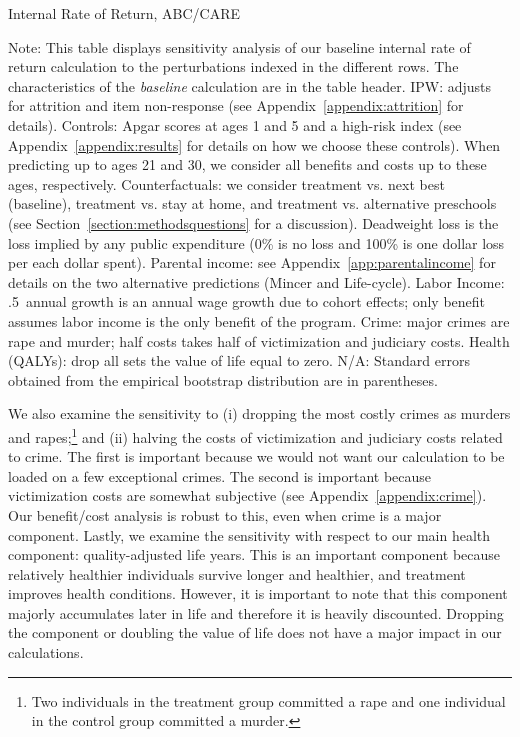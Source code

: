 \begin{table} 
\begin{threeparttable}
\caption{Internal Rate of Return, ABC/CARE}
\label{table:irrsens}
\centering 
\footnotesize

\begin{tablenotes}
\footnotesize
\item Note: This table displays sensitivity analysis of our baseline internal rate of return calculation to the perturbations indexed in the different rows. The characteristics of the \textit{baseline} calculation are in the table header. IPW: adjusts for attrition and item non-response (see Appendix~\ref{appendix:attrition} for details). Controls: Apgar scores at ages 1 and 5 and a high-risk index (see Appendix~\ref{appendix:results} for details on how we choose these controls). When predicting up to ages 21 and 30, we consider all benefits and costs up to these ages, respectively. Counterfactuals: we consider treatment vs. next best (baseline), treatment vs. stay at home, and treatment vs. alternative preschools (see Section~\ref{section:methodsquestions} for a discussion). Deadweight loss is the loss implied by any public expenditure (0\% is no loss and 100\% is one dollar loss per each dollar spent). Parental income: see Appendix~\ref{app:parentalincome} for details on the two alternative predictions (Mincer and Life-cycle). Labor Income: .5\ annual growth is an annual wage growth due to cohort effects; only benefit assumes labor income is the only benefit of the program. Crime: major crimes are rape and murder; half costs takes half of victimization and judiciary costs. Health (QALYs): drop all sets the value of life equal to zero. N/A: Standard errors obtained from the empirical bootstrap distribution are in parentheses.
\end{tablenotes}
\end{threeparttable}
\end{table}
\restoregeometry
\doublespacing

We also examine the sensitivity to (i) dropping the most costly crimes as murders and rapes;\footnote{Two individuals in the treatment group committed a rape and one individual in the control group committed a murder.} and (ii) halving the costs of victimization and judiciary costs related to crime.  The first is important because we would not want our calculation to be loaded on a few exceptional crimes. The second is important because victimization costs are somewhat subjective (see Appendix~\ref{appendix:crime}). Our benefit/cost analysis is robust to this, even when crime is a major component. Lastly, we examine the sensitivity with respect to our main health component: quality-adjusted life years. This is an important component because relatively healthier individuals survive longer and healthier, and treatment improves health conditions. However, it is important to note that this component majorly accumulates later in life and therefore it is heavily discounted. Dropping the component or doubling the value of life does not have a major impact in our calculations.

